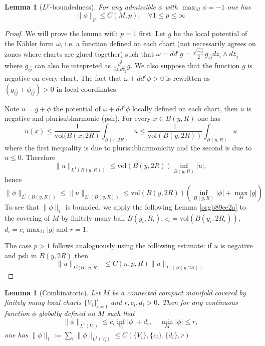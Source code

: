 \documentclass[11pt]{article}
\newtheorem{lemma}[theorem]{Lemma}
\begin{document}
\begin{lemma}[$L^p$-boundedness]
For any admissible \(\phi\) with \(\max_M \phi = -1\) one has
\[
\| \phi\|_p\leq C(M,p),\quad \forall 1\leq p\leq\infty
\]
\end{lemma}

\begin{proof}
We will prove the lemma with \(p=1\) first. Let \(g\) be the local potential of the Kähler form
\(\omega\), i.e. a function defined on each chart (not necessarily agrees on zones where
charts are glued together) such that \(\omega = dd^c g = \frac{\sqrt{-1}}{2}g_{i\bar j}dz_i\wedge d\bar
z_j\) where \(g_{i\bar j}\) can also be intepreted as \(\frac{\partial^2}{\partial z_i \partial\bar z_j}
g\). We also suppose that the function \(g\) is negative on every chart. The fact that \(\omega +
dd^c\phi >0\) is rewritten as \((g_{i\bar j} + \phi_{i\bar j}) >0\) in local coordinates.

Note \(u=g + \phi\) the potential of \(\omega + dd^c\phi\) locally defined on each chart, then \(u\)
is negative and plurisubharmonic (psh). For every \(x\in B(y,R)\) one has
\[
u(x) \leq \frac{1}{\text{vol}(B(x,2R)}\int_{B(x,2R)} u \leq \frac{1}{\text{vol}(B(y,2R))}\int_{B(y,R)}u
\]
where the first inequality is due to plurisubharmonicity and the second is due to \(u\leq
0\). Therefore
\[
\| u\|_{L^1(B(y,R))} \leq \text{vol}(B(y,2R)) \inf_{B(y,R)} |u|,
\]
hence
\[
\|\phi\|_{L^1(B(y,R))} \leq \|u\|_{L^1(B(y,R))} \leq \text{vol}(B(y,2R)) (\inf_{B(y,R)} |\phi| + \max_M |g|)
\]
To see that \(\|\phi\|_1\) is bounded, we apply the following Lemma \ref{orgb89ce2a} to the covering of \(M\) by
finitely many ball \(B(y_i,R_i)\), \(c_i = \text{vol}(B(y_i,2R_i))\), \(d_i = c_i \max_M |g|\) and
\(r=1\).

The case \(p>1\) follows analoguously using the following estimate: if \(u\) is negative and psh in \(B(y,2R)\) then
\[
\|u \|_{L^{p}(B(y,R)} \leq C(n,p,R)\|u\|_{L^1(B(y,2R))}
\]
\end{proof}

\begin{lemma}[Combinatoric]
\label{lem:combinatoire}
\label{orgb89ce2a}
Let \(M\) be a connected compact manifold covered by finitely many local charts \(\{V_i\}_{i=1}^{l}\) and
\(r, c_i, d_i>0\). Then for any continuous function \(\phi\) globally
defined on \(M\) such that
\[
\|\phi\|_{L^1(V_i)} \leq c_i \inf_{V_i} |\phi| + d_i,\quad \min_M |\phi| \leq r,
\]
one has \(\|\phi\|_1:= \sum_i \|\phi\|_{L^1(V_i)}\leq C(\{V_i\},\{c_i\}, \{d_i\}, r)\)
\end{lemma}
\end{document}
